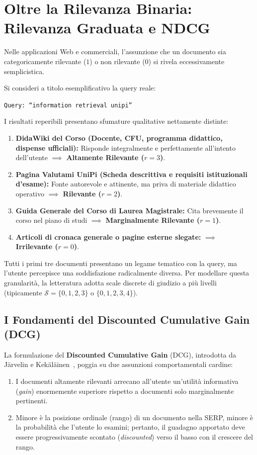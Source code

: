 \section{Oltre la Rilevanza Binaria: Rilevanza Graduata e NDCG}
\label{sec:rilevanza-graduata-ndcg}

Nelle applicazioni Web e commerciali, l'assunzione che un documento sia categoricamente rilevante ($1$) o non rilevante ($0$) si rivela eccessivamente semplicistica. 

Si consideri a titolo esemplificativo la query reale:
\begin{center}
\texttt{Query: ``information retrieval unipi''}
\end{center}
I risultati reperibili presentano sfumature qualitative nettamente distinte:
\begin{enumerate}
    \item \textbf{DidaWiki del Corso (Docente, CFU, programma didattico, dispense ufficiali):} Risponde integralmente e perfettamente all'intento dell'utente $\implies$ \textbf{Altamente Rilevante ($r = 3$)}.
    \item \textbf{Pagina Valutami UniPi (Scheda descrittiva e requisiti istituzionali d'esame):} Fonte autorevole e attinente, ma priva di materiale didattico operativo $\implies$ \textbf{Rilevante ($r = 2$)}.
    \item \textbf{Guida Generale del Corso di Laurea Magistrale:} Cita brevemente il corso nel piano di studi $\implies$ \textbf{Marginalmente Rilevante ($r = 1$)}.
    \item \textbf{Articoli di cronaca generale o pagine esterne slegate:} $\implies$ \textbf{Irrilevante ($r = 0$)}.
\end{enumerate}

Tutti i primi tre documenti presentano un legame tematico con la query, ma l'utente percepisce una soddisfazione radicalmente diversa. Per modellare questa granularit\`a, la letteratura adotta scale discrete di giudizio a pi\`u livelli (tipicamente $\mathcal{S} = \{0, 1, 2, 3\}$ o $\{0, 1, 2, 3, 4\}$).

\FloatBarrier
\subsection{I Fondamenti del Discounted Cumulative Gain (DCG)}
\label{subsec:fondamenti-dcg}

La formulazione del \textbf{Discounted Cumulative Gain} (DCG), introdotta da J\"arvelin e Kek\"al\"ainen~\cite{jarvelin2002}, poggia su due assunzioni comportamentali cardine:
\begin{enumerate}
    \item I documenti altamente rilevanti arrecano all'utente un'utilit\`a informativa (\textit{gain}) enormemente superiore rispetto a documenti solo marginalmente pertinenti.
    \item Minore \`e la posizione ordinale (rango) di un documento nella SERP, minore \`e la probabilit\`a che l'utente lo esamini; pertanto, il guadagno apportato deve essere progressivamente scontato (\textit{discounted}) verso il basso con il crescere del rango.
\end{enumerate}

